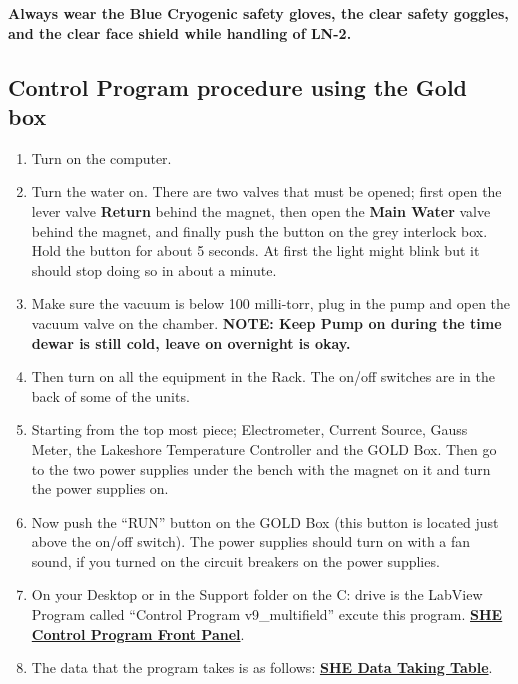 \documentclass{../lab}
\newcommand{\SHEControlProgramFrontPanel}{http://experimentationlab.berkeley.edu/sites/default/files/images/SHE_FrontPanel.pdf}
\newcommand{\SHEDataTakingTable}{http://experimentationlab.berkeley.edu/sites/default/files/images/SHE_Data_Taking_Table.pdf}
\begin{document}
\textbf{Always wear the Blue Cryogenic safety gloves, the clear safety goggles, and the clear face shield while handling of LN-2.}

\subsection{Control Program procedure using the Gold box}

\begin{enumerate}
    \item Turn on the computer.

    \item Turn the water on. There are two valves that must be opened; first open the lever valve \textbf{Return} behind the magnet, then open the \textbf{Main Water} valve behind the magnet, and finally push the button on the grey interlock box. Hold the button for about 5 seconds. At first the light might blink but it should stop doing so in about a minute.

    \item Make sure the vacuum is below 100 milli-torr, plug in the pump and open the vacuum valve on the chamber. \textbf{NOTE: Keep Pump on during the time dewar is still cold, leave on overnight is okay.}

    \item Then turn on all the equipment in the Rack. The on/off switches are in the back of some of the units.

    \item Starting from the top most piece; Electrometer, Current Source, Gauss Meter, the Lakeshore Temperature Controller and the GOLD Box. Then go to the two power supplies under the bench with the magnet on it and turn the power supplies on.

    \item Now push the ``RUN'' button on the GOLD Box (this button is located just above the on/off switch). The power supplies should turn on with a fan sound, if you turned on the circuit breakers on the power supplies.

    \item On your Desktop or in the Support folder on the C: drive is the LabView Program called ``Control Program v9\_multifield'' excute this program. \href{\SHEControlProgramFrontPanel}{\textbf{SHE Control Program Front Panel}}.

    \item The data that the program takes is as follows: \href{\SHEDataTakingTable}{\textbf{SHE Data Taking Table}}.


\end{enumerate}
\end{document}
